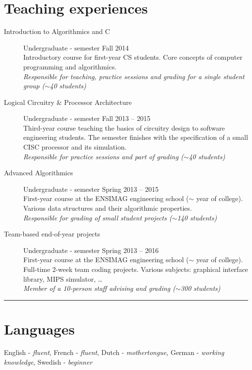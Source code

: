 \documentclass[english,9pt]{extarticle}
\begin{document}
\section*{Teaching experiences}
\begin{adjustwidth}{1em}{}
	\begin{description}
		\item[Introduction to Algorithmics and C] \quad Undergraduate -  semester \hfill Fall
			2014 \\
			Introductory course for first-year CS students. Core concepts of computer programming and
			algorithmics. \\
			\textit{Responsible for teaching, practice sessions and grading for a single student group
			($\sim$40 students)}
		\item[Logical Circuitry \& Processor Architecture] \quad Undergraduate -  semester \hfill
			Fall 2013 -- 2015\\
			Third-year course teaching the basics of circuitry design to software engineering students.
			The semester finishes with the specification of a small CISC processor and its simulation. \\
			\textit{Responsible for practice sessions and part of grading ($\sim$40 students)}
		\item[Advanced Algorithmics] \quad Undergraduate -  semester \hfill Spring 2013 -- 2015
			\\
			First-year course at the ENSIMAG engineering school ($\sim$ year of college). Various
			data structures and their algorithmic properties. \\
			\textit{Responsible for grading of small student projects ($\sim$140 students)}
		\item[Team-based end-of-year projects] \quad Undergraduate -  semester \hfill Spring 2013
			-- 2016 \\
			First-year course at the ENSIMAG engineering school ($\sim$ year of college). Full-time
			2-week team coding projects. Various subjects: graphical interface library, MIPS simulator,
			\dots \\
			\textit{Member of a 10-person staff advising and grading ($\sim$300 students)}
	\end{description}
\end{adjustwidth}


\noindent\rule{\textwidth}{1pt}

\section*{Languages}
\begin{adjustwidth}{1em}{}
	English - \textit{fluent}, French - \textit{fluent}, Dutch - \textit{mothertongue}, German -
	\textit{working knowledge}, Swedish - \textit{beginner}
\end{adjustwidth}
\end{document}
